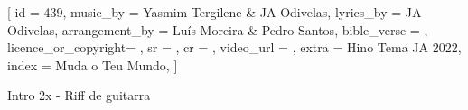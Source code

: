 [
    id                  = {439},
    music_by            = {Yasmim Tergilene & JA Odivelas}, %
    lyrics_by           = {JA Odivelas}, %
    arrangement_by      = {Luís Moreira & Pedro Santos}, %
    bible_verse         = {},
    licence_or_copyright= {},
    sr                  = {},
    cr                  = {},
    video_url           = {}, %
    extra               = {Hino Tema JA 2022},
    index               = {Muda o Teu Mundo},
]

\beginverse
Intro 2x - Riff de guitarra
\endverse

\beginverse


